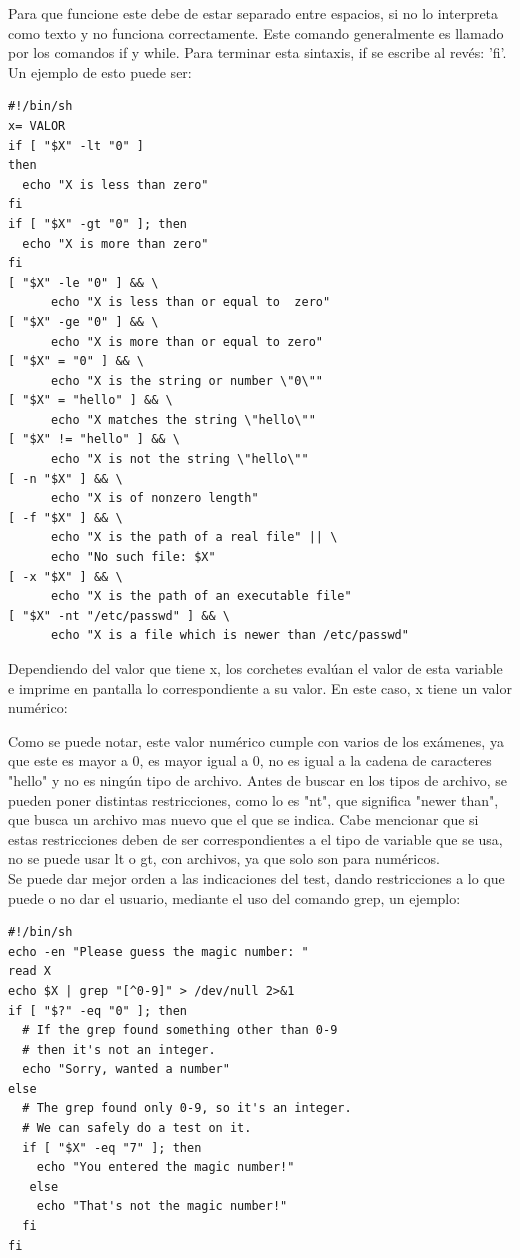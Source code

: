 \documentclass[12pt]{article}
\begin{document}
Para que funcione este debe de estar separado entre espacios, si no lo interpreta como texto y no funciona correctamente. Este comando generalmente es llamado por los comandos if y while. Para terminar esta sintaxis, if se escribe al revés: 'fi'. Un ejemplo de esto puede ser:

\begin{verbatim}
#!/bin/sh
x= VALOR
if [ "$X" -lt "0" ]
then
  echo "X is less than zero"
fi
if [ "$X" -gt "0" ]; then
  echo "X is more than zero"
fi
[ "$X" -le "0" ] && \
      echo "X is less than or equal to  zero"
[ "$X" -ge "0" ] && \
      echo "X is more than or equal to zero"
[ "$X" = "0" ] && \
      echo "X is the string or number \"0\""
[ "$X" = "hello" ] && \
      echo "X matches the string \"hello\""
[ "$X" != "hello" ] && \
      echo "X is not the string \"hello\""
[ -n "$X" ] && \
      echo "X is of nonzero length"
[ -f "$X" ] && \
      echo "X is the path of a real file" || \
      echo "No such file: $X"
[ -x "$X" ] && \
      echo "X is the path of an executable file"
[ "$X" -nt "/etc/passwd" ] && \
      echo "X is a file which is newer than /etc/passwd"
\end{verbatim}

Dependiendo del valor que tiene x, los corchetes evalúan el valor de esta variable e imprime en pantalla lo correspondiente a su valor. En este caso, x tiene un valor numérico:

Como se puede notar, este valor numérico cumple con varios de los exámenes, ya que este es mayor a 0, es mayor igual a 0, no es igual a la cadena de caracteres "hello" y no es ningún tipo de archivo. Antes de buscar en los tipos de archivo, se pueden poner distintas restricciones, como lo es "nt", que significa "newer than", que busca un archivo mas nuevo que el que se indica. Cabe mencionar que si estas restricciones deben de ser correspondientes a el tipo de variable que se usa, no se puede usar lt o gt, con archivos, ya que solo son para numéricos.\\

Se puede dar mejor orden a las indicaciones del test, dando restricciones a lo que puede o no dar el usuario, mediante el uso del comando grep, un ejemplo:

\begin{verbatim}
#!/bin/sh
echo -en "Please guess the magic number: "
read X
echo $X | grep "[^0-9]" > /dev/null 2>&1
if [ "$?" -eq "0" ]; then
  # If the grep found something other than 0-9
  # then it's not an integer.
  echo "Sorry, wanted a number"
else
  # The grep found only 0-9, so it's an integer. 
  # We can safely do a test on it.
  if [ "$X" -eq "7" ]; then
    echo "You entered the magic number!"
   else
    echo "That's not the magic number!"
  fi
fi
\end{verbatim}
\end{document}

